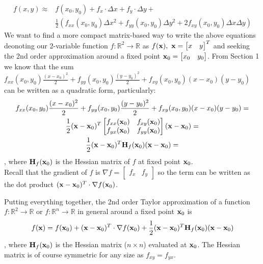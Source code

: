 \documentclass[a4paper]{article}
\numberwithin{equation}{section} %
\newcommand{\setR}{\mathbb{R}} %
\newcommand{\setRn}{\mathbb{R}^n} %
\newcommand{\B}[1]{\textbf{\textup{#1}}} %
\begin{document}
\begin{equation}
\begin{split}
f(x,y) \approx & f(x_0,y_0) + f_x \cdot \Delta x + f_y \cdot \Delta y +\\
										& \frac{1}{2} \left ( f_{xx}(x_0,y_0)\Delta x^2 + f_{yy}(x_0,y_0)\Delta y^2 + 2f_{xy}(x_0,y_0)\Delta x \Delta y \right )
\end{split}
\label{eq:taylor_multivar_Dx}
\end{equation}
We want to find a more compact matrix-based way to write the above equations deonoting our 2-variable function $f:\setR^2 \rightarrow \setR$ as $f(\B{x}),\ \B{x}=\begin{bmatrix}x & y \end{bmatrix}^T$ and seeking the 2nd order approximation around a fixed point $\B{x}_0 = \begin{bmatrix}x_0 & y_0 \end{bmatrix}$. From Section 1 we know that the sum $f_{xx}(x_0,y_0)\frac{(x-x_0)^2}{2} + f_{yy}(x_0,y_0)\frac{(y-y_0)^2}{2} + f_{xy}(x_0,y_0)(x-x_0)(y-y_0)$ can be written as a quadratic form, particularly:
\[
\begin{gathered}
f_{xx}(x_0,y_0)\frac{(x-x_0)^2}{2} + f_{yy}(x_0,y_0)\frac{(y-y_0)^2}{2} + f_{xy}(x_0,y_0)(x-x_0)(y-y_0) =\\ 
\frac{1}{2}(\B{x}-\B{x}_0)^T \begin{bmatrix}f_{xx}(\B{x}_0) & f_{xy}(\B{x}_0) \\f_{yx}(\B{x}_0) & f_{yy}(\B{x}_0)  \end{bmatrix} (\B{x} - \B{x}_0) = \\
\frac{1}{2}(\B{x}-\B{x}_0)^T \B{H}_f(\B{x}_0)(\B{x} - \B{x}_0) = 
\end{gathered}
\]
, where $\B{H}_f(\B{x}_0)$ is the Hessian matrix of $f$ at fixed point $\B{x}_0$.\\
Recall that the gradient of $f$ is $\nabla f = \begin{bmatrix}f_x & f_y \end{bmatrix}$ so the term can be written as the dot product $(\B{x} - \B{x}_0)^T \cdot \nabla f (\B{x}_0)$. 
\begin{corollary}
Putting everything together, the 2nd order Taylor approximation of a function $f:\setR^2 \rightarrow \setR$ or $f:\setRn \rightarrow \setR$ in general around a fixed point $\B{x}_0$ is
\begin{equation}
f(\B{x}) = f(\B{x}_0) + (\B{x} - \B{x}_0)^T \cdot \nabla f (\B{x}_0) + \frac{1}{2}(\B{x}-\B{x}_0)^T \B{H}_f(\B{x}_0)(\B{x} - \B{x}_0)
\label{eq:taylor_multivar}
\end{equation}
, where $\B{H}_f(\B{x}_0)$ is the Hessian matrix ($n \times n$) evaluated at $\B{x}_0$. The Hessian matrix is of course symmetric for any size as $f_{xy}=f_{yx}.$
\end{corollary}
\end{document}
